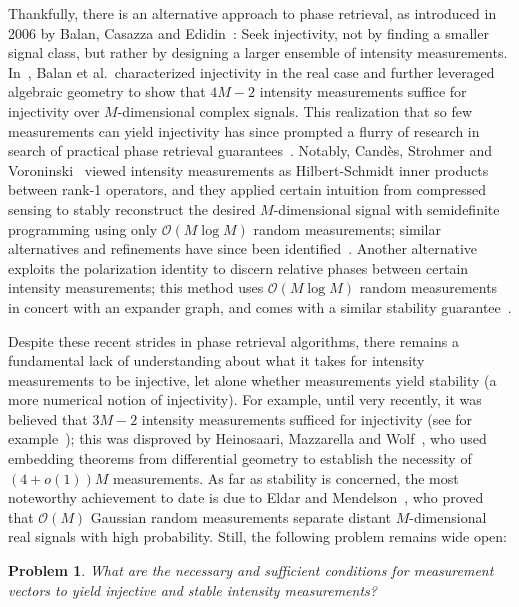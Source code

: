\documentclass[times,10pt]{elsarticle}
\theoremstyle{plain}
\newtheorem{problem}[theorem]{Problem}
\begin{document}
Thankfully, there is an alternative approach to phase retrieval, as introduced in 2006 by Balan, Casazza and Edidin~\cite{BalanCE:06}:
Seek injectivity, not by finding a smaller signal class, but rather by designing a larger ensemble of intensity measurements.
In~\cite{BalanCE:06}, Balan et al.\ characterized injectivity in the real case and further leveraged algebraic geometry to show that $4M-2$ intensity measurements suffice for injectivity over $M$-dimensional complex signals.
This realization that so few measurements can yield injectivity has since prompted a flurry of research in search of practical phase retrieval guarantees~\cite{AlexeevBFM:12,Balan:12,BalanBCE:09,CandesESV:11,CandesL:12,CandesSV:11,DemanetH:12,EldarM:12,WaldspurgerAM:12}.
Notably, Cand\`{e}s, Strohmer and Voroninski~\cite{CandesSV:11} viewed intensity measurements as Hilbert-Schmidt inner products between rank-1 operators, and they applied certain intuition from compressed sensing to stably reconstruct the desired $M$-dimensional signal with semidefinite programming using only $\mathcal{O}(M\log M)$ random measurements; similar alternatives and refinements have since been identified~\cite{CandesESV:11,CandesL:12,DemanetH:12,WaldspurgerAM:12}.
Another alternative exploits the polarization identity to discern relative phases between certain intensity measurements; this method uses $\mathcal{O}(M\log M)$ random measurements in concert with an expander graph, and comes with a similar stability guarantee~\cite{AlexeevBFM:12}.

Despite these recent strides in phase retrieval algorithms, there remains a fundamental lack of understanding about what it takes for intensity measurements to be injective, let alone whether measurements yield stability (a more numerical notion of injectivity).
For example, until very recently, it was believed that $3M-2$ intensity measurements sufficed for injectivity (see for example~\cite{CandesESV:11}); this was disproved by Heinosaari, Mazzarella and Wolf~\cite{HeinosaariMW:11}, who used embedding theorems from differential geometry to establish the necessity of $(4+o(1))M$ measurements.
As far as stability is concerned, the most noteworthy achievement to date is due to Eldar and Mendelson~\cite{EldarM:12}, who proved that $\mathcal{O}(M)$ Gaussian random measurements separate distant $M$-dimensional real signals with high probability.
Still, the following problem remains wide open:

\begin{problem}
What are the necessary and sufficient conditions for measurement vectors to yield injective and stable intensity measurements?
\end{problem}
\end{document}

